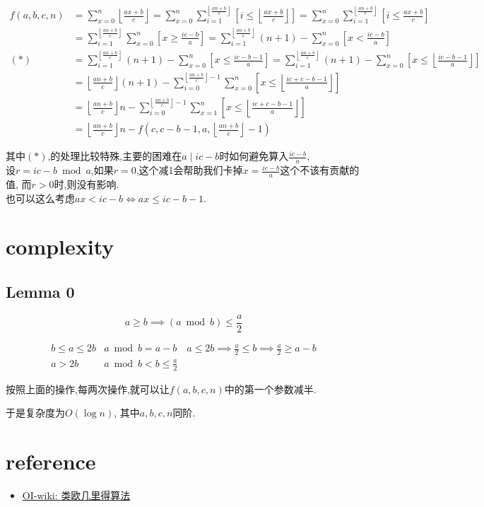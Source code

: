 \documentclass{article}
\begin{document}
\[
	\begin{aligned}
		f(a,b,c,n)
			&=\sum_{x=0}^n \left\lfloor\frac{ax+b}{c}\right\rfloor
			 =\sum_{x=0}^n \sum_{i=1}^{\left\lfloor\frac{an+b}{c}\right\rfloor}
			 	\left[ i \leq \left\lfloor\frac{ax+b}{c}\right\rfloor \right]
			 =\sum_{x=0}^n \sum_{i=1}^{\left\lfloor\frac{an+b}{c}\right\rfloor}
			 	\left[ i \leq \frac{ax+b}{c} \right]\\
			&=\sum_{i=1}^{\left\lfloor\frac{an+b}{c}\right\rfloor}
					\sum_{x=0}^n \left[ x\geq \frac{ic-b}{a} \right]
			=\sum_{i=1}^{\left\lfloor\frac{an+b}{c}\right\rfloor}
					(n+1)-\sum_{x=0}^n \left[ x < \frac{ic-b}{a}\right]\\
	(*) &=\sum_{i=1}^{\left\lfloor\frac{an+b}{c}\right\rfloor}
					(n+1)-\sum_{x=0}^n \left[ x \leq \frac{ic-b-1}{a}\right]
			 =\sum_{i=1}^{\left\lfloor\frac{an+b}{c}\right\rfloor}
					(n+1)-\sum_{x=0}^n \left[ x \leq \left\lfloor\frac{ic-b-1}{a}\right\rfloor\right]\\
			&={\left\lfloor\frac{an+b}{c}\right\rfloor}(n+1)
				-\sum_{i=0}^{{\left\lfloor\frac{an+b}{c}\right\rfloor}- 1}
				\sum_{x=0}^n \left[ x \leq \left\lfloor\frac{ic+c-b-1}{a}\right\rfloor\right]\\
			&={\left\lfloor\frac{an+b}{c}\right\rfloor}n
				-\sum_{i=0}^{{\left\lfloor\frac{an+b}{c}\right\rfloor}- 1}
				\sum_{x=1}^n \left[ x \leq \left\lfloor\frac{ic+c-b-1}{a}\right\rfloor\right]\\
			&={\left\lfloor\frac{an+b}{c}\right\rfloor}n-f\left(c,c-b-1,a,\left\lfloor\frac{an+b}{c}\right\rfloor -1\right)
	\end{aligned}
\]

其中$(\ast)$,的处理比较特殊,主要的困难在$a\mid ic-b$时如何避免算入$\frac{ic-b}{a}$,\\
设$r=ic-b\bmod a$,如果$r=0$,这个减1会帮助我们卡掉$x=\frac{ic-b}{a}$这个不该有贡献的值, 而$r>0$时,则没有影响.\\
也可以这么考虑$ax < ic-b\iff ax \leq ic-b-1$.


\section{complexity}

\subsection*{Lemma 0}

\[ a\geq b \implies (a\bmod b) \leq \frac{a}{2} \]

\[
\begin{array}{c|l}
	b\leq a\leq 2b & a\bmod b=a-b\quad a\leq 2b\implies \frac{a}{2}\leq b\implies \frac{a}{2}\geq a-b\\
	a > 2b & a\bmod b < b \leq \frac{a}{2}
\end{array}
\]

\noindent 按照上面的操作,每两次操作,就可以让$f(a,b,c,n)$中的第一个参数减半.\par
\noindent 于是复杂度为$O(\log n)$, 其中$a,b,c,n$同阶.


\appendix

\section{reference}

\begin{itemize}
	\item \href{https://oi-wiki.org/math/euclidean/}{OI-wiki: 类欧几里得算法}
\end{itemize}
\end{document}
